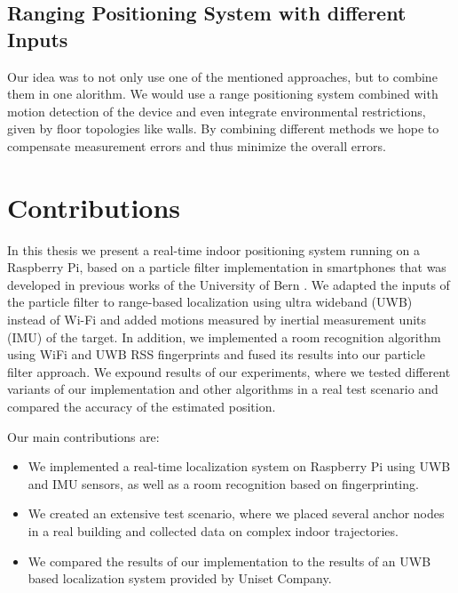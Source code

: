 \subsection{Ranging Positioning System with different Inputs}

Our idea was to not only use one of the mentioned approaches, but to combine them in one alorithm. We would use a range positioning system combined with motion detection of the device and even integrate environmental restrictions, given by floor topologies like walls. By combining different methods we hope to compensate measurement errors and thus minimize the overall errors.



\section{Contributions}

In this thesis we present a real-time indoor positioning system running on a Raspberry Pi, based on a particle filter implementation in smartphones that was developed in previous works of the University of Bern \cite{Carrera}. We adapted the inputs of the particle filter to range-based localization using ultra wideband (UWB) instead of Wi-Fi and added motions measured by inertial measurement units (IMU) of the target. In addition, we implemented a room recognition algorithm using WiFi and UWB RSS fingerprints and fused its results into our particle filter approach.
We expound results of our experiments, where we tested different variants of our implementation and other algorithms in a real test scenario and compared the accuracy of the estimated position.

Our main contributions are:
\begin{itemize}
\item We implemented a real-time localization system on Raspberry Pi using UWB and IMU sensors, as well as a room recognition based on fingerprinting. 
\item We created an extensive test scenario, where we placed several anchor nodes in a real building and collected data on complex indoor trajectories. 
\item We compared the results of our implementation to the results of an UWB based localization system provided by Uniset Company.
\end{itemize}



